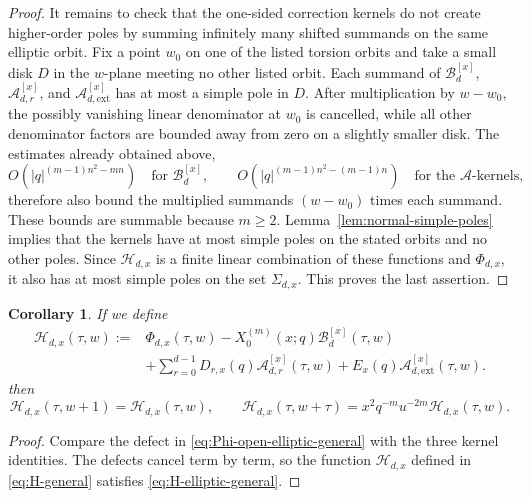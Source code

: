 \documentclass[12pt]{amsart}
\numberwithin{equation}{section}
\newtheorem{corollary}[theorem]{Corollary}
\begin{document}
\begin{proof}
It remains to check that the one-sided correction kernels do not create higher-order poles by summing infinitely many shifted summands on the same elliptic orbit.  Fix a point \(w_0\) on one of the listed torsion orbits and take a small disk \(D\) in the \(w\)-plane meeting no other listed orbit.  Each summand of \(\mathcal B_d^{[x]}\), \(\mathcal A_{d,r}^{[x]}\), and \(\mathcal A_{d,\mathrm{ext}}^{[x]}\) has at most a simple pole in \(D\).  After multiplication by \(w-w_0\), the possibly vanishing linear denominator at \(w_0\) is cancelled, while all other denominator factors are bounded away from zero on a slightly smaller disk.  The estimates already obtained above,
\[
        O\!\left(|q|^{(m-1)n^2-mn}\right)
        \quad\text{for }\mathcal B_d^{[x]},
        \qquad
        O\!\left(|q|^{(m-1)n^2-(m-1)n}\right)
        \quad\text{for the }\mathcal A\text{-kernels},
\]
therefore also bound the multiplied summands \((w-w_0)\) times each summand.  These bounds are summable because \(m\ge2\).  Lemma~\ref{lem:normal-simple-poles} implies that the kernels have at most simple poles on the stated orbits and no other poles.  Since \(\mathcal H_{d,x}\) is a finite linear combination of these functions and \(\Phi_{d,x}\), it also has at most simple poles on the set \(\Sigma_{d,x}\).  This proves the last assertion.
\end{proof}


\begin{corollary}
If we define
\begin{equation}\label{eq:H-general}
\begin{aligned}
\mathcal H_{d,x}(\tau,w)
:={}&
\Phi_{d,x}(\tau,w)
-
X_0^{(m)}(x;q)\mathcal B_d^{[x]}(\tau,w)\\
&+
\sum_{r=0}^{d-1}D_{r,x}(q)\mathcal A_{d,r}^{[x]}(\tau,w)
+
E_x(q)\mathcal A_{d,\mathrm{ext}}^{[x]}(\tau,w).
\end{aligned}
\end{equation}
then
\begin{equation}\label{eq:H-elliptic-general}
\mathcal H_{d,x}(\tau,w+1)=\mathcal H_{d,x}(\tau,w),
\qquad
\mathcal H_{d,x}(\tau,w+\tau)=x^2q^{-m}u^{-2m}\mathcal H_{d,x}(\tau,w).
\end{equation}
\end{corollary}
\begin{proof}
    Compare the defect in \eqref{eq:Phi-open-elliptic-general} with the three kernel identities.  The defects cancel term by term, so the function $\mathcal H_{d,x}$ defined in \eqref{eq:H-general} satisfies \eqref{eq:H-elliptic-general}.
\end{proof}
\end{document}
